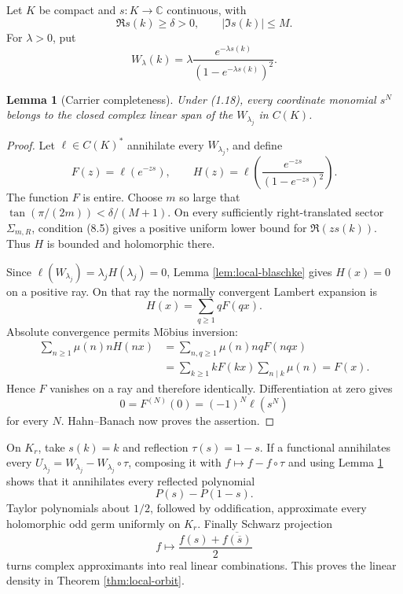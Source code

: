 \documentclass[11pt]{article}
\newtheorem{lemma}[theorem]{Lemma}
\newcommand{\C}{\mathbb C}
\begin{document}
Let \(K\) be compact and \(s:K\to\C\) continuous, with
\[
 \Re s(k)\ge\delta>0,\qquad |\Im s(k)|\le M.
\tag{8.5}
\]
For \(\lambda>0\), put
\[
 W_\lambda(k)=
 \lambda\frac{e^{-\lambda s(k)}}{(1-e^{-\lambda s(k)})^2}.
\tag{8.6}
\]

\begin{lemma}[Carrier completeness]\label{lem:carrier-complete}
Under (1.18), every coordinate monomial \(s^N\) belongs to the closed complex linear span of
the \(W_{\lambda_j}\) in \(C(K)\).
\end{lemma}

\begin{proof}
Let \(\ell\in C(K)^*\) annihilate every \(W_{\lambda_j}\), and define
\[
 F(z)=\ell(e^{-zs}),\qquad
 H(z)=\ell\!\left(\frac{e^{-zs}}{(1-e^{-zs})^2}\right).
\tag{8.7}
\]
The function \(F\) is entire.  Choose \(m\) so large that
\(\tan(\pi/(2m))<\delta/(M+1)\).  On every sufficiently right-translated sector
\(\Sigma_{m,R}\), condition (8.5) gives a positive uniform lower bound for
\(\Re(zs(k))\).  Thus \(H\) is bounded and holomorphic there.

Since \(\ell(W_{\lambda_j})=\lambda_jH(\lambda_j)=0\), Lemma
\ref{lem:local-blaschke} gives \(H(x)=0\) on a positive ray.  On that ray the
normally convergent Lambert expansion is
\[
 H(x)=\sum_{q\ge1}qF(qx).
\tag{8.8}
\]
Absolute convergence permits M\"obius inversion:
\[
\begin{aligned}
 \sum_{n\ge1}\mu(n)nH(nx)
 &=\sum_{n,q\ge1}\mu(n)nqF(nqx)\\
 &=\sum_{k\ge1}kF(kx)\sum_{n\mid k}\mu(n)
 =F(x).
\end{aligned}
\tag{8.9}
\]
Hence \(F\) vanishes on a ray and therefore identically.  Differentiation at zero gives
\[
 0=F^{(N)}(0)=(-1)^N\ell(s^N)
\tag{8.10}
\]
for every \(N\).  Hahn--Banach now proves the assertion.
\end{proof}

On \(K_r\), take \(s(k)=k\) and reflection \(\tau(s)=1-s\).  If a functional
annihilates every \(U_{\lambda_j}=W_{\lambda_j}-W_{\lambda_j}\circ\tau\), composing it with
\(f\mapsto f-f\circ\tau\) and using Lemma \ref{lem:carrier-complete} shows that it annihilates
every reflected polynomial
\[
 P(s)-P(1-s).
\tag{8.11}
\]
Taylor polynomials about \(1/2\), followed by oddification, approximate every holomorphic odd
germ uniformly on \(K_r\).  Finally Schwarz projection
\[
 f\longmapsto\frac{f(s)+\overline{f(\overline s)}}2
\tag{8.12}
\]
turns complex approximants into real linear combinations.  This proves the linear density in
Theorem \ref{thm:local-orbit}.
\end{document}
